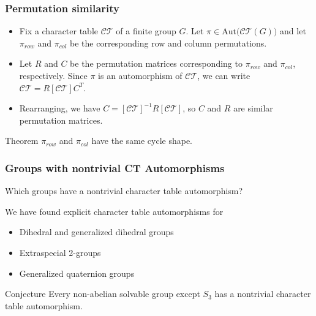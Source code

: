 \documentclass[xcolor=dvipsnames]{beamer}
\theoremstyle{remark}
\theoremstyle{plain}
\theoremstyle{definition}
\begin{document}
\begin{frame}
\frametitle{Permutation similarity}
\begin{itemize}
\item Fix a character table $\mathcal{CT}$ of a finite group $G$. Let
$\pi\in\mathrm{Aut(}\mathcal{CT}(G)\mathrm{)}$ and let $\pi_{row}$ and
$\pi_{col}$ be the corresponding row and column permutations. \pause

\item Let $R$ and $C$ be the permutation matrices corresponding to
$\pi_{row}$ and $\pi_{col}$, respectively. Since $\pi$ is an
automorphism of $\mathcal{CT}$, we can write
$\mathcal{CT}=R[\mathcal{CT}]C^T$.\pause

\item Rearranging, we have $C=[\mathcal{CT}]^{-1}R[\mathcal{CT}]$, so $C$
and $R$ are similar permutation matrices.\pause
\end{itemize}

\begin{block}{Theorem}
  $\pi_{row}$ and
  $\pi_{col}$ have the same cycle shape.
\end{block}
\end{frame}

\begin{frame}
\frametitle{Groups with nontrivial CT Automorphisms}
Which groups have a nontrivial character table automorphism?\pause\vspace{.3cm}

We have found explicit character table automorphisms for
\begin{itemize}
\item Dihedral and generalized dihedral groups
\item Extraspecial 2-groups
\item Generalized quaternion groups\pause
\end{itemize}
\begin{block}{Conjecture}
Every non-abelian solvable group except $S_3$ has a nontrivial character table automorphism.
\end{block}
\end{frame}
\end{document}
